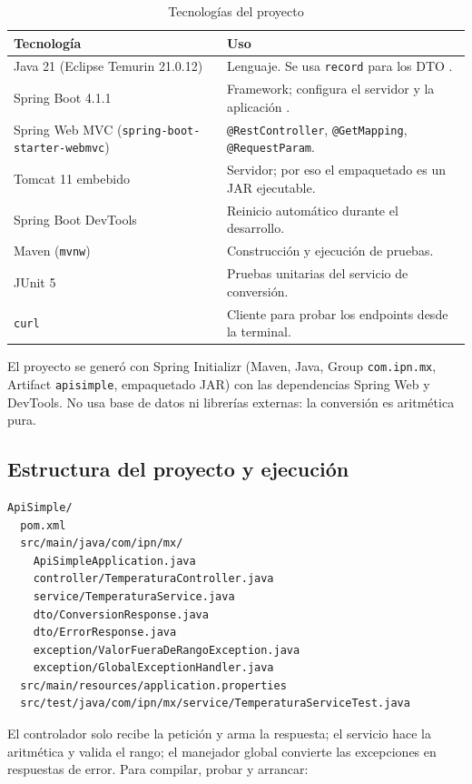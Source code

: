 \documentclass[10pt,a4paper]{article}
\begin{document}
\begin{table}[H]
	\centering
	\small
	\begin{tabular}{l l}
		\toprule
		\textbf{Tecnología} & \textbf{Uso} \\
		\midrule
		Java 21 (Eclipse Temurin 21.0.12) & Lenguaje. Se usa \texttt{record} para los DTO \cite{jep395}. \\
		Spring Boot 4.1.1 & Framework; configura el servidor y la aplicación \cite{spring_boot_ref}. \\
		Spring Web MVC (\texttt{spring-boot-starter-webmvc}) & \texttt{@RestController}, \texttt{@GetMapping}, \texttt{@RequestParam}. \\
		Tomcat 11 embebido & Servidor; por eso el empaquetado es un JAR ejecutable. \\
		Spring Boot DevTools & Reinicio automático durante el desarrollo. \\
		Maven (\texttt{mvnw}) & Construcción y ejecución de pruebas. \\
		JUnit 5 & Pruebas unitarias del servicio de conversión. \\
		\texttt{curl} & Cliente para probar los endpoints desde la terminal. \\
		\bottomrule
	\end{tabular}
	\caption{Tecnologías del proyecto}
	\label{tab:tecnologias}
\end{table}

El proyecto se generó con Spring Initializr (Maven, Java, Group \texttt{com.ipn.mx}, Artifact \texttt{apisimple}, empaquetado JAR) con las dependencias Spring Web y DevTools. No usa base de datos ni librerías externas: la conversión es aritmética pura.

\subsection{Estructura del proyecto y ejecución}

\begin{lstlisting}[style=consola]
ApiSimple/
  pom.xml
  src/main/java/com/ipn/mx/
    ApiSimpleApplication.java
    controller/TemperaturaController.java
    service/TemperaturaService.java
    dto/ConversionResponse.java
    dto/ErrorResponse.java
    exception/ValorFueraDeRangoException.java
    exception/GlobalExceptionHandler.java
  src/main/resources/application.properties
  src/test/java/com/ipn/mx/service/TemperaturaServiceTest.java
\end{lstlisting}

El controlador solo recibe la petición y arma la respuesta; el servicio hace la aritmética y valida el rango; el manejador global convierte las excepciones en respuestas de error. Para compilar, probar y arrancar:
\end{document}
